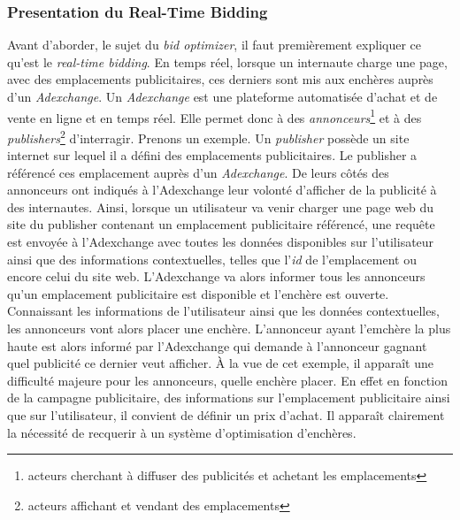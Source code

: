         \subsubsection{Presentation du Real-Time Bidding}
            Avant d'aborder, le sujet du \emph{bid optimizer}, il faut premièrement expliquer ce qu'est le 
            \emph{real-time bidding}. En temps réel, lorsque un internaute charge une page, avec des emplacements 
            publicitaires, ces derniers sont mis aux enchères auprès d'un \emph{Adexchange}. Un \emph{Adexchange} est 
            une plateforme automatisée d'achat et de vente en ligne et en temps réel. Elle permet donc à des 
            \emph{annonceurs}\footnote{acteurs cherchant à diffuser des publicités et achetant les emplacements} 
            et à des \emph{publishers}\footnote{acteurs affichant et vendant des emplacements} d'interragir. Prenons
            un exemple. Un \emph{publisher} possède un site internet sur lequel il a défini des emplacements 
            publicitaires. Le publisher a référencé ces emplacement auprès d'un  \emph{Adexchange}. De leurs côtés des 
            annonceurs ont indiqués à l'Adexchange leur volonté d'afficher de la publicité à des internautes. Ainsi,
            lorsque un utilisateur va venir charger une page web du site du publisher contenant un emplacement 
            publicitaire référencé, une requête est envoyée à l'Adexchange avec toutes les données disponibles sur 
            l'utilisateur ainsi que des informations contextuelles, telles que l'\emph{id} de l'emplacement ou encore 
            celui du site web. L'Adexchange va alors informer tous les annonceurs qu'un emplacement publicitaire est 
            disponible et l'enchère est ouverte. Connaissant les informations de l'utilisateur ainsi que les données 
            contextuelles, les annonceurs vont alors placer une enchère. L'annonceur ayant l'emchère la plus haute est 
            alors informé par l'Adexchange qui demande à l'annonceur gagnant quel publicité ce dernier veut afficher.
            À la vue de cet exemple, il apparaît une difficulté majeure pour les annonceurs, quelle enchère placer. En 
            effet en fonction de la campagne publicitaire, des informations sur l'emplacement publicitaire ainsi que 
            sur l'utilisateur, il convient de définir un prix d'achat. Il apparaît clairement la nécessité de 
            recquerir à un système d'optimisation d'enchères.
